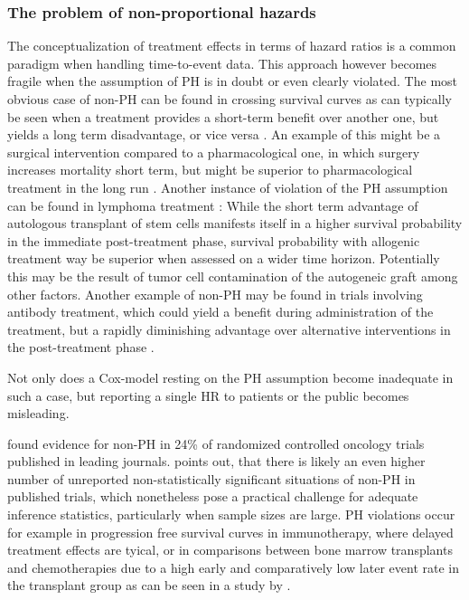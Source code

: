 \documentclass[main.tex]{subfiles}
\begin{document}
\subsubsection{The problem of non-proportional hazards}
The conceptualization of treatment effects in terms of hazard ratios is a common paradigm when handling time-to-event data. This approach however becomes fragile when the assumption of PH is in doubt or even clearly violated. The most obvious case of non-PH can be found in crossing survival curves as can typically be seen when a treatment provides a short-term benefit over another one, but yields a long term disadvantage, or vice versa \parencite{li2015statistical}. An example of this might be a surgical intervention compared to a pharmacological one, in which surgery increases mortality short term, but might be superior to pharmacological treatment in the long run \parencite{kleinbaum2012survival}. Another instance of violation of the PH assumption can be found in lymphoma treatment \parencite{giebel2014improving}: While the short term advantage of autologous transplant of stem cells manifests itself in a higher survival probability in the immediate post-treatment phase, survival probability with allogenic treatment way be superior when assessed on a wider time horizon. Potentially this may be the result of tumor cell contamination of the autogeneic graft among other factors. Another example of non-PH may be found in trials involving antibody treatment, which could yield a benefit during administration of the treatment, but a rapidly diminishing advantage over alternative interventions in the post-treatment phase \parencite{royston2014approach}. 

Not only does a Cox-model resting on the PH assumption become inadequate in such a case, but reporting a single HR to patients or the public becomes misleading.

\textcite{Trinquart2016-gb} found evidence for non-PH in 24\% of randomized controlled oncology trials published in leading journals. \textcite{royston2018power} points out, that there is likely an even higher number of unreported non-statistically significant situations of non-PH in published trials, which nonetheless pose a practical challenge for adequate inference statistics, particularly when sample sizes are large. PH violations occur for example in progression free survival curves in immunotherapy, where delayed treatment effects are tyical, or in comparisons between bone marrow transplants and chemotherapies due to a high early and comparatively low later event rate in the transplant group as can be seen in a study by \textcite{zittoun1995autologous}.
\end{document}
